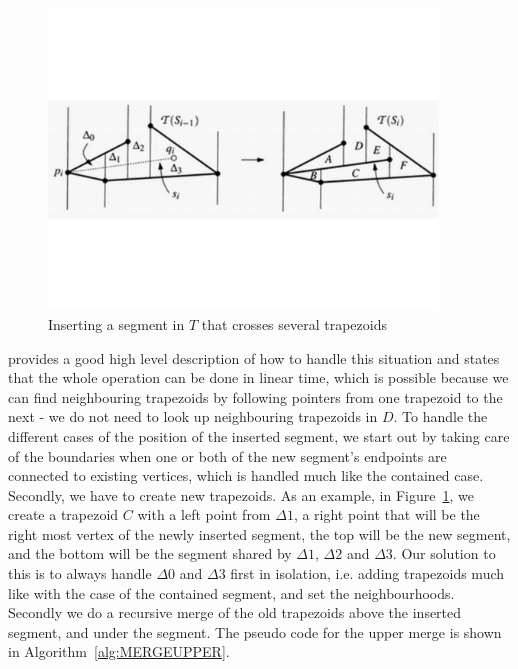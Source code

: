 \begin{figure}[t]
    \centering
      \includegraphics[height=80mm]{images/intersecting_segments.pdf}
    \caption{Inserting a segment in $T$ that crosses several trapezoids}
    \label{fig:intersecting_segments}
\end{figure}

\cite{computational_geometry} provides a good high level description of how to handle this situation and states that the whole operation can be done in linear time, which is possible because we can find neighbouring trapezoids by following pointers from one trapezoid to the next  - we do not need to look up neighbouring trapezoids in $D$. To handle the different cases of the position of the inserted segment, we start out by taking care of the boundaries when one or both of the new segment's endpoints are connected to existing vertices, which is handled much like the contained case. Secondly, we have to create new trapezoids. As an example, in Figure~\ref{fig:intersecting_segments}, we create a  trapezoid $C$ with a left point from $\Delta 1$, a right point that will be the right most vertex of the newly inserted segment, the top will be the new segment, and the bottom will be the segment shared by  $\Delta 1$,  $\Delta 2$ and  $\Delta 3$.  Our solution to this is to always handle $\Delta 0$ and $\Delta 3$ first in isolation, i.e. adding trapezoids much like with the case of the contained segment, and set the neighbourhoods. Secondly we do a recursive merge of the old trapezoids above the inserted segment, and under the segment. The pseudo code for the upper merge is shown in Algorithm~\ref{alg:MERGEUPPER}.


